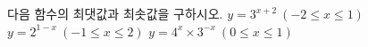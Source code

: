 다음 함수의 최댓값과 최솟값을 구하시오.
 $y=3^{x+2}\ (-2\le x\le 1)$
 $y=2^{1-x}\ (-1\le x\le 2)$
 $y=4^x\times 3^{-x}\ (0\le x\le 1)$
